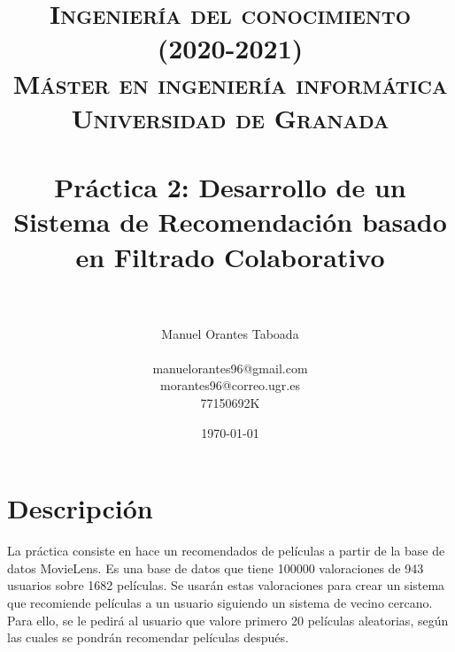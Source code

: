 
\usepackage{booktabs}
\usepackage{tabularx}
\usepackage{multicol} 
\usepackage{hyperref}


\title{
\normalfont \normalsize 
\textsc{\textbf{Ingeniería del conocimiento (2020-2021)} \\ Máster en ingeniería informática \\ Universidad de Granada} \\ [25pt] %
\horrule{0.5pt} \\[0.4cm] %
\huge Práctica 2: Desarrollo de un Sistema de Recomendación basado
en Filtrado Colaborativo \\ %
\horrule{2pt} \\[0.5cm] %
}
\author{Manuel Orantes Taboada \\ \\ manuelorantes96@gmail.com \\ morantes96@correo.ugr.es \\ 77150692K} %

\date{\normalsize\today} %




\maketitle %

\newpage %

\tableofcontents %

\newpage

\section{Descripción}

La práctica consiste en hace un recomendados de películas a partir de la base de datos MovieLens. Es una base de datos que tiene 100000 valoraciones de 943 usuarios sobre 1682 películas. Se usarán estas valoraciones para crear un sistema que recomiende películas a un usuario siguiendo un sistema de vecino cercano. Para ello, se le pedirá al usuario que valore primero 20 películas aleatorias, según las cuales se pondrán recomendar películas después.

